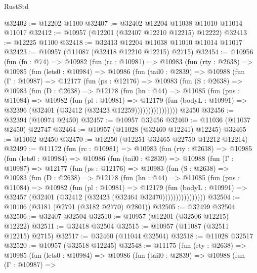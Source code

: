 \begin{lexlean}{RustStd}
\begin{coremodule}
@32402 := @12202 @1100
@32407 := @32402 @12204 @11038 @11010 @11014 @11017
@32412 := @10957 (@12201 (@32407 @12210 @12215) @12222)
@32413 := @12225 @1100
@32418 := @32413 @12204 @11038 @11010 @11014 @11017
@32423 := @10957 (@11087 (@32418 @12210 @12215) @2715)
@32454 := @10956
    (fun (fn : @74) =>
    @10982
      (fun (rc : @10981) =>
      @10983
        (fun (rty : @2638) =>
        @10985
          (fun (lets0 : @10984) =>
          @10986
            (fun (tail0 : @2839) =>
            @10988
              (fun (Γ : @10987) =>
              @12177
                (fun (ps : @12176) =>
                @10983
                  (fun (S : @2638) =>
                  @10983
                    (fun (D : @2638) =>
                    @12178
                      (fun (hn : @44) =>
                      @11085
                        (fun (pns : @11084) =>
                        @10982
                          (fun (pl : @10981) =>
                          @12179
                            (fun (bodyL : @10991) =>
                            @32396 (@32401 (@32412 (@32423 @12259))))))))))))))))
    @2450
@32456 := @32394 (@10974 @2450)
@32457 := @10957 @32456
@32460 := @11036 (@11037 @2450) @22747
@32464 := @10957 (@11028 (@32460 @12241) @12245)
@32465 := @11062 @2450
@32470 := @12250 (@12251 @32465 @22750 @12212 @12214)
@32499 := @11172
    (fun (rc : @10981) =>
    @10983
      (fun (rty : @2638) =>
      @10985
        (fun (lets0 : @10984) =>
        @10986
          (fun (tail0 : @2839) =>
          @10988
            (fun (Γ : @10987) =>
            @12177
              (fun (ps : @12176) =>
              @10983
                (fun (S : @2638) =>
                @10983
                  (fun (D : @2638) =>
                  @12178
                    (fun (hn : @44) =>
                    @11085
                      (fun (pns : @11084) =>
                      @10982
                        (fun (pl : @10981) =>
                        @12179
                          (fun (bodyL : @10991) =>
                          @32457 (@32401 (@32412 (@32423 (@32464 @32470))))))))))))))))
@32504 := @10106 (@3181 (@2791 (@3182 @2770) @2801))
@32505 := @32499 @32504
@32506 := @32407 @32504
@32510 := @10957 (@12201 (@32506 @12215) @12222)
@32511 := @32418 @32504
@32515 := @10957 (@11087 (@32511 @12215) @2715)
@32517 := @32460 (@11044 @32504)
@32518 := @11028 @32517
@32520 := @10957 (@32518 @12245)
@32548 := @11175
    (fun (rty : @2638) =>
    @10985
      (fun (lets0 : @10984) =>
      @10986
        (fun (tail0 : @2839) =>
        @10988
          (fun (Γ : @10987) =>

\end{coremodule}
\end{lexlean}
